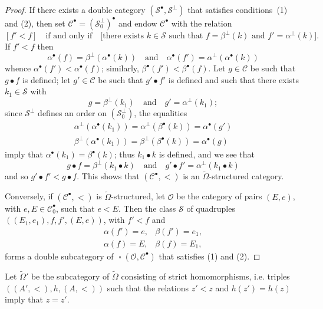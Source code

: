 \documentclass[a4paper,fleqn]{article}
\theoremstyle{plain}
\theoremstyle{definition}
\newcommand{\textand}{\quad\text{and}\quad}
\newcommand{\CC}{\mathcal{C}}
\renewcommand{\SS}{\mathcal{S}}
\DeclareMathOperator{\sq}{\square}
\begin{document}
\begin{proof}
  If there exists a double category $(\SS^\bullet,\SS^\perp)$ that satisfies conditions~(1) and (2), then set $\CC^\bullet=(\SS_0^\perp)^\bullet$ and endow $\CC^\bullet$ with the relation
  \[
    [f' < f]
    \quad\text{if and only if}\quad
    \big[\text{there exists $k\in\SS$ such that $f=\beta^\perp(k)$ and $f'=\alpha^\perp(k)$}\big].
  \]
  If $f'<f$ then
  \[
    \alpha^\bullet(f) = \beta^\perp(\alpha^\bullet(k))
    \textand
    \alpha^\bullet(f') = \alpha^\perp(\alpha^\bullet(k))
  \]
  whence $\alpha^\bullet(f')<\alpha^\bullet(f)$;
  similarly, $\beta^\bullet(f')<\beta^\bullet(f)$.
  Let $g\in\CC$ be such that $g\bullet f$ is defined;
  let $g'\in\CC$ be such that $g'\bullet f'$ is defined and such that there exists $k_1\in\SS$ with
  \[
    g=\beta^\perp(k_1)
    \textand
    g'=\alpha^\perp(k_1);
  \]
  since $\SS^\perp$ defines an order on $(\SS_0^\perp)$, the equalities
  \[
    \begin{gathered}
      \alpha^\perp(\alpha^\bullet(k_1))
      = \alpha^\perp(\beta^\bullet(k))
      = \alpha^\bullet(g')
    \\\beta^\perp(\alpha^\bullet(k_1))
      = \beta^\perp(\beta^\bullet(k))
      = \alpha^\bullet(g)
    \end{gathered}
  \]
  imply that $\alpha^\bullet(k_1)=\beta^\bullet(k)$;
  thus $k_1\bullet k$ is defined, and we see that
  \[
    g\bullet f = \beta^\perp(k_1\bullet k)
    \textand
    g'\bullet f' = \alpha^\perp(k_1\bullet k)
  \]
  and so $g'\bullet f'<g\bullet f$.
  This shows that $(\CC^\bullet,<)$ is an $\widetilde{\Omega}$-structured category.

  Conversely, if $(\CC^\bullet,<)$ is $\widetilde{\Omega}$-structured, let $\mathcal{O}$ be the category of pairs $(E,e)$, with $e,E\in\CC_0^\bullet$, such that $e<E$.
  Then the class $\SS$ of quadruples $((E_1,e_1),f,f',(E,e))$, with $f'<f$ and
  \[
    \begin{array}{cc}
      \alpha(f')=e,
      & \beta(f')=e_1,
    \\\alpha(f)=E,
      &\beta(f)=E_1,
    \end{array}
  \]
  forms a double subcategory of $\sq(\mathcal{O},\CC^\bullet)$ that satisfies (1) and (2).
\end{proof}

Let $\widetilde{\Omega}'$ be the subcategory of $\widetilde{\Omega}$ consisting of strict homomorphisms, i.e. triples $((A',<),h,(A,<))$ such that the relations $z'<z$ and $h(z')=h(z)$ imply that $z=z'$.
\end{document}

